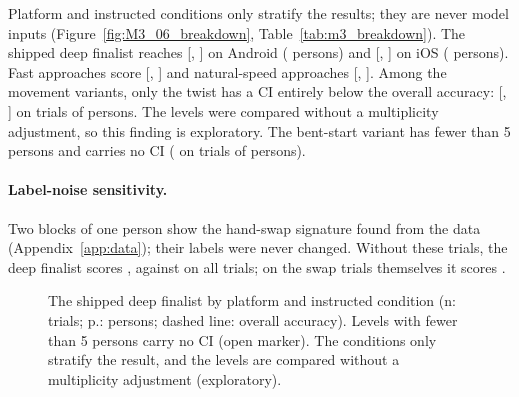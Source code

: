 Platform and instructed conditions only stratify the results; they are never model inputs (Figure~\ref{fig:M3_06_breakdown}, Table~\ref{tab:m3_breakdown}).
The shipped deep finalist reaches  [, ] on Android ( persons) and  [, ] on iOS ( persons).
Fast approaches score  [, ] and natural-speed approaches  [, ].
Among the movement variants, only the twist has a CI entirely below the overall accuracy:  [, ] on  trials of  persons.
The levels were compared without a multiplicity adjustment, so this finding is exploratory.
The bent-start variant has fewer than 5 persons and carries no CI ( on  trials of  persons).

\paragraph{Label-noise sensitivity.}
Two blocks of one person show the hand-swap signature found from the data (Appendix~\ref{app:data}); their labels were never changed.
Without these  trials, the deep finalist scores , against  on all trials; on the swap trials themselves it scores .

\begin{figure}[tbp]
  \centering
  \caption{The shipped deep finalist by platform and instructed condition (n: trials; p.: persons; dashed line: overall accuracy). Levels with fewer than 5 persons carry no CI (open marker). The conditions only stratify the result, and the levels are compared without a multiplicity adjustment (exploratory).}
  \label{fig:M3_06_breakdown}\label{fig:app:m3-breakdown}
\end{figure}


